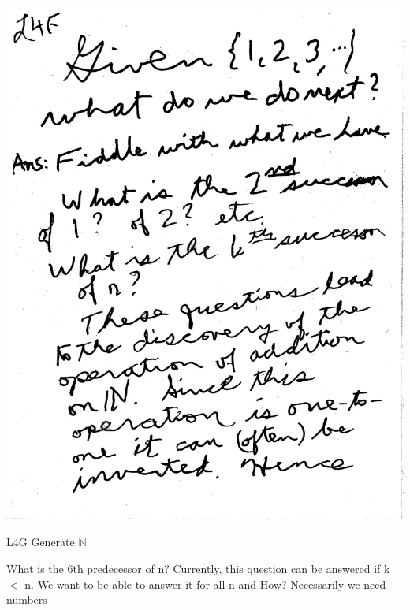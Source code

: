 \documentclass[10pt,a4paper]{article}
\begin{document}
{{\includegraphics[scale=0.5]{Pages/generateN6.pdf}

\newpage

\begin{Large}
L4G Generate $\mathbb{N}$
\end{Large}

What is the 6th predecessor of n? Currently, this question can be answered if k $<$ n. We want to be able to answer it for all n and How? Necessarily we need numbers

}}
\end{document}
